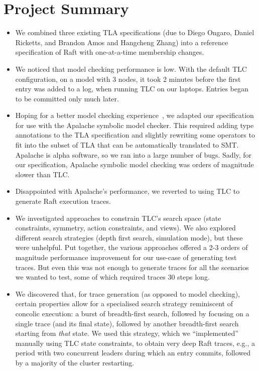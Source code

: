 \documentclass[a4paper]{article}
\makeatletter
\newcommand*{\eg}{e.g.\@\xspace}
\makeatother
\begin{document}
\section{Project Summary}

\begin{itemize}
    \item We combined three existing TLA specifications (due to Diego Ongaro, Daniel Ricketts, and Brandon Amos and Hangcheng Zhang) into a reference specification of Raft with one-at-a-time membership changes.

    \item We noticed that model checking performance is low.
    With the default TLC configuration, on a model with 3 nodes, it took 2 minutes before the first entry was added to a log, when running TLC on our laptops.
    Entries began to be committed only much later.

    \item Hoping for a better model checking experience~\cite{mcmillan_symbolic_1992}, we adapted our specification for use with the Apalache symbolic model checker.
    This required adding type annotations to the TLA specification and slightly rewriting some operators to fit into the subset of TLA that can be automatically translated to SMT.
    Apalache is alpha software, so we ran into a large number of bugs.
    Sadly, for our specification, Apalache symbolic model checking was orders of magnitude slower than TLC.

    \item Disappointed with Apalache's performance, we reverted to using TLC to generate Raft execution traces.
    
    \item We investigated approaches to constrain TLC's search space (state constraints, symmetry, action constraints, and views).
    We also explored different search strategies (depth first search, simulation mode), but these were unhelpful.
    Put together, the various approaches offered a 2-3 orders of magnitude performance improvement for our use-case of generating test traces.
    But even this was not enough to generate traces for all the scenarios we wanted to test, some of which required traces 30 steps long.

    \item We discovered that, for trace generation (as opposed to model checking), certain properties allow for a specialised search strategy reminiscent of concolic execution: a burst of breadth-first search, followed by focusing on a single trace (and its final state), followed by another breadth-first search starting from \emph{that} state.
    We used this strategy, which we ``implemented'' manually using TLC state constraints, to obtain very deep Raft traces, \eg, a period with two concurrent leaders during which an entry commits, followed by a majority of the cluster restarting.


\end{itemize}
\end{document}
